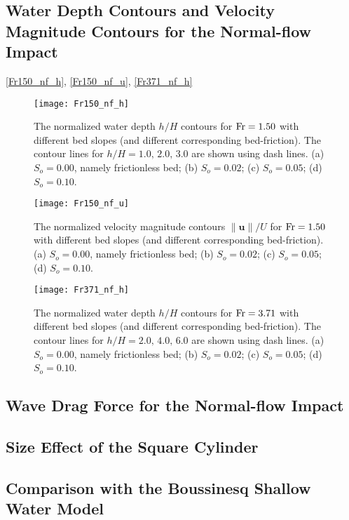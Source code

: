 \documentclass{jfm}
\newcommand{\fr}{{\rm{Fr}}}
\begin{document}
\subsection{Water Depth Contours and Velocity Magnitude Contours for the Normal-flow Impact}
\autoref{Fr150_nf_h}, \autoref{Fr150_nf_u}, \autoref{Fr371_nf_h}

\cite{Causon2001}

\begin{figure}
	\centerline{\texttt{[image: Fr150\_nf\_h]}}
	\caption{The normalized water depth $h/H$ contours for $\fr=1.50$ with different bed slopes (and different corresponding bed-friction). The contour lines for $h/H=1.0,\, 2.0,\, 3.0$ are shown using dash lines. (a) $S_o=0.00$, namely frictionless bed; (b) $S_o=0.02$; (c) $S_o=0.05$; (d) $S_o=0.10$.} 
	\label{Fr150_nf_h}
\end{figure}

\begin{figure}
	\centerline{\texttt{[image: Fr150\_nf\_u]}}
	\caption{The normalized velocity magnitude contours $\left\|{\pmb{u}}\right\|/U$ for $\fr=1.50$ with different bed slopes (and different corresponding bed-friction).  (a) $S_o=0.00$, namely frictionless bed; (b) $S_o=0.02$; (c) $S_o=0.05$; (d) $S_o=0.10$.} 
	\label{Fr150_nf_u}
\end{figure}

\begin{figure}
	\centerline{\texttt{[image: Fr371\_nf\_h]}}
	\caption{The normalized water depth $h/H$ contours for $\fr=3.71$ with different bed slopes (and different corresponding bed-friction). The contour lines for $h/H=2.0,\, 4.0,\, 6.0$ are shown using dash lines. (a) $S_o=0.00$, namely frictionless bed; (b) $S_o=0.02$; (c) $S_o=0.05$; (d) $S_o=0.10$.} 
	\label{Fr371_nf_h}
\end{figure}


\subsection{Wave Drag Force for the Normal-flow Impact}




\subsection{Size Effect of the Square Cylinder}



\subsection{Comparison with the Boussinesq Shallow Water Model}
\end{document}
